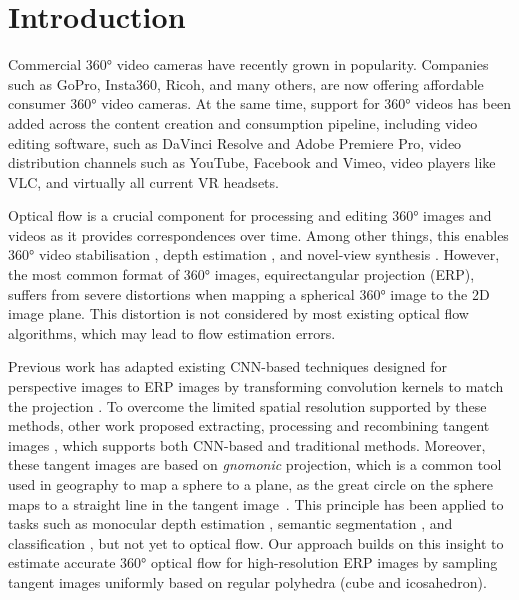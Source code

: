 \section{Introduction}
\label{sec:intro}

Commercial 360° video cameras have recently grown in popularity.
Companies such as GoPro, Insta360, Ricoh, and many others, are now offering affordable consumer 360° video cameras.
At the same time, support for 360° videos has been added across the content creation and consumption pipeline, including video editing software, such as DaVinci Resolve and Adobe Premiere Pro,
video distribution channels such as YouTube, Facebook and Vimeo,
video players like VLC, and virtually all current VR headsets.


Optical flow is a crucial component for processing and editing 360° images and videos as it provides correspondences over time.
Among other things, this enables 360° video stabilisation \cite{Kopf2016}, depth estimation \cite{ZioulKZAD2019}, and novel-view synthesis \cite{BerteYLR2020}.
However, the most common format of 360° images, equirectangular projection (ERP), suffers from severe distortions when mapping a spherical 360° image to the 2D image plane.
This distortion is not considered by most existing optical flow algorithms,
which may lead to flow estimation errors.


Previous work has adapted existing CNN-based techniques designed for perspective images to ERP images by transforming convolution kernels to match the projection \cite{CoorsCG2018, SuG2019, TatenNT2018}.
To overcome the limited spatial resolution supported by these methods, other work proposed extracting, processing and recombining tangent images \cite{EderSLF2020, LuoZSX2019, ZhangLSC2019, LeeJYJY2019, WangHCLYSCS2018, WangYSCT2020}, which supports both CNN-based and traditional methods.
Moreover, these tangent images are based on \emph{gnomonic} projection, which is a common tool used in geography to map a sphere to a plane, as the great circle on the sphere maps to a straight line in the tangent image~\cite{EderSLF2020}.
This principle has been applied to tasks such as monocular depth estimation \cite{WangHCLYSCS2018, WangYSCT2020}, semantic segmentation \cite{EderSLF2020, ZhangLSC2019}, and classification \cite{EderSLF2020, LuoZSX2019, LeeJYJY2019}, but not yet to optical flow.
Our approach builds on this insight to estimate accurate 360° optical flow for high-resolution ERP images by sampling tangent images uniformly based on regular polyhedra (cube and icosahedron).


